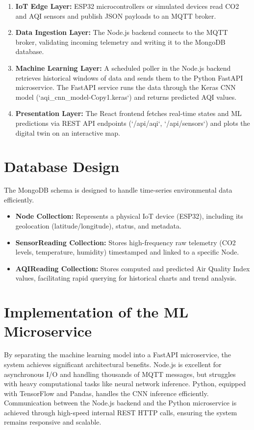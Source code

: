\documentclass[a4paper, 12pt]{report}
\begin{document}
\begin{enumerate}
\item \textbf{IoT Edge Layer:} ESP32 microcontrollers or simulated devices read CO2 and AQI sensors and publish JSON payloads to an MQTT broker.
\item \textbf{Data Ingestion Layer:} The Node.js backend connects to the MQTT broker, validating incoming telemetry and writing it to the MongoDB database.
\item \textbf{Machine Learning Layer:} A scheduled poller in the Node.js backend retrieves historical windows of data and sends them to the Python FastAPI microservice. The FastAPI service runs the data through the Keras CNN model (`aqi\_cnn\_model-Copy1.keras`) and returns predicted AQI values.
\item \textbf{Presentation Layer:} The React frontend fetches real-time states and ML predictions via REST API endpoints (`/api/aqi`, `/api/sensors`) and plots the digital twin on an interactive map.
\end{enumerate}

\section{Database Design} 
The MongoDB schema is designed to handle time-series environmental data efficiently.
\begin{itemize}
\item \textbf{Node Collection:} Represents a physical IoT device (ESP32), including its geolocation (latitude/longitude), status, and metadata.
\item \textbf{SensorReading Collection:} Stores high-frequency raw telemetry (CO2 levels, temperature, humidity) timestamped and linked to a specific Node.
\item \textbf{AQIReading Collection:} Stores computed and predicted Air Quality Index values, facilitating rapid querying for historical charts and trend analysis.
\end{itemize}

\section{Implementation of the ML Microservice}
By separating the machine learning model into a FastAPI microservice, the system achieves significant architectural benefits. Node.js is excellent for asynchronous I/O and handling thousands of MQTT messages, but struggles with heavy computational tasks like neural network inference. Python, equipped with TensorFlow and Pandas, handles the CNN inference efficiently. Communication between the Node.js backend and the Python microservice is achieved through high-speed internal REST HTTP calls, ensuring the system remains responsive and scalable.
\end{document}
